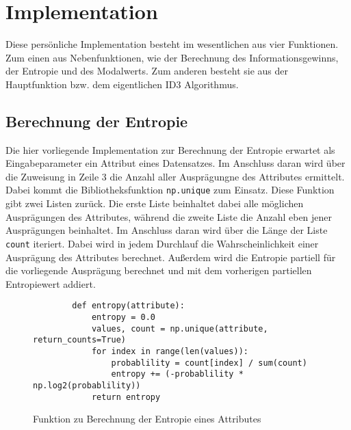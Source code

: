 \section{Implementation}
\label{id3:implementation}

Diese persönliche Implementation besteht im wesentlichen aus vier Funktionen. Zum einen aus Nebenfunktionen, wie der Berechnung des Informationsgewinns, der Entropie und des Modalwerts. Zum anderen besteht sie aus der Hauptfunktion bzw. dem eigentlichen ID3 Algorithmus.

\subsection{Berechnung der Entropie}
\label{id3:implementation-entropie}
Die hier vorliegende Implementation zur Berechnung der Entropie erwartet als Eingabeparameter ein Attribut eines Datensatzes. Im Anschluss daran wird über die Zuweisung in Zeile 3 die Anzahl aller Ausprägungne des Attributes ermittelt. Dabei kommt die Bibliotheksfunktion \texttt{np.unique} zum Einsatz. Diese Funktion gibt zwei Listen zurück. Die erste Liste beinhaltet dabei alle möglichen Ausprägungen des Attributes, während die zweite Liste die Anzahl eben jener Ausprägungen beinhaltet. Im Anschluss daran wird über die Länge der Liste \texttt{count} iteriert. Dabei wird in jedem Durchlauf die Wahrscheinlichkeit einer Ausprägung des Attributes berechnet. Außerdem wird die Entropie partiell für die vorliegende Ausprägung berechnet und mit dem vorherigen partiellen Entropiewert addiert.

\begin{figure}[H]
    \vspace{0.5cm}
    \centering
    \begin{verbatim}
        def entropy(attribute):
            entropy = 0.0
            values, count = np.unique(attribute, return_counts=True)
            for index in range(len(values)):
                probablility = count[index] / sum(count)
                entropy += (-probablility * np.log2(probablility))
            return entropy
    \end{verbatim}
    \caption{Funktion zu Berechnung der Entropie eines Attributes\autocites{PythonCourseDecisionTrees:online}{ImplementationID3}}
\end{figure}

